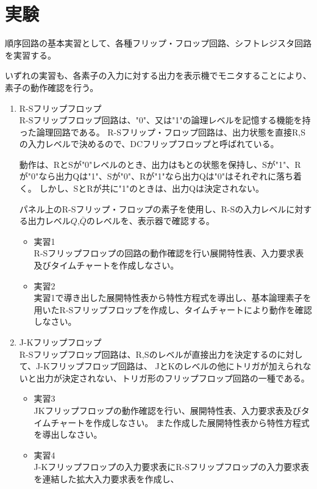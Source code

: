 \documentclass[dvipdfmx]{jsarticle}
\begin{document}
	\section{実験}
		順序回路の基本実習として、各種フリップ・フロップ回路、シフトレジスタ回路を実習する。\par
		いずれの実習も、各素子の入力に対する出力を表示機でモニタすることにより、素子の動作確認を行う。
		\begin{enumerate}
			\item R-Sフリップフロップ \\
				R-Sフリップフロップ回路は、"0"、又は"1"の論理レベルを記憶する機能を持った論理回路である。
				R-Sフリップ・フロップ回路は、出力状態を直接R,Sの入力レベルで決めるので、DCフリップフロップと呼ばれている。\par
				動作は、RとSが"0"レベルのとき、出力はもとの状態を保持し、Sが"1"、Rが"0"なら出力Qは"1"、Sが"0"、Rが"1"なら出力Qは"0"はそれぞれに落ち着く。
				しかし、SとRが共に"1"のときは、出力Qは決定されない。\par
				パネル上のR-Sフリップ・フロップの素子を使用し、R-Sの入力レベルに対する出力レベル$Q$,$\bar{Q}$のレベルを、表示器で確認する。
				\begin{itemize}
					\item 実習1 \\
					R-Sフリップフロップの回路の動作確認を行い展開特性表、入力要求表及びタイムチャートを作成しなさい。
					\item 実習2 \\
					実習1で導き出した展開特性表から特性方程式を導出し、基本論理素子を用いたR-Sフリップフロップを作成し、タイムチャートにより動作を確認しなさい。
				\end{itemize}
			\item J-Kフリップフロップ \\
				R-Sフリップフロップ回路は、R,Sのレベルが直接出力を決定するのに対して、J-Kフリップフロップ回路は、
				JとKのレベルの他にトリガが加えられないと出力が決定されない、トリガ形のフリップフロップ回路の一種である。\par
				\begin{itemize}
					\item 実習3 \\
						JKフリップフロップの動作確認を行い、展開特性表、入力要求表及びタイムチャートを作成しなさい。
						また作成した展開特性表から特性方程式を導出しなさい。
					\item 実習4 \\
						J-Kフリップフロップの入力要求表にR-Sフリップフロップの入力要求表を連結した拡大入力要求表を作成し、

\end{itemize}
\end{enumerate}
\end{document}
